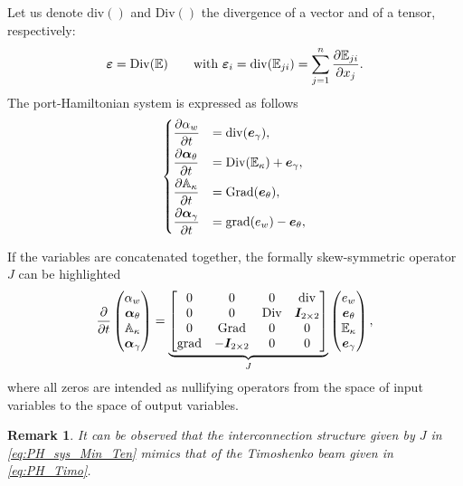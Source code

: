 \documentclass[preprint,12pt]{elsarticle}
\newtheorem{remark}{Remark}
\begin{document}
Let us denote $\mathrm{div}()$ and $\mathrm{Div}()$ the divergence of a vector and of a tensor, respectively:
\begin{equation*}
    \bm{\varepsilon} = \mathrm{Div}(\mathbb{E})  \qquad \text{with } \bm{\varepsilon}_i = \mathrm{div}(\mathbb{E}_{ji}) = \sum_{j = 1}^n \diffp{\mathbb{E}_{ji}}{x_j}.
\end{equation*}
The port-Hamiltonian system is expressed as follows 
\begin{equation}
\begin{cases}
\displaystyle\diffp{\alpha_w}{t} &= \mathrm{div}(\bm{e}_{\gamma}), \vspace{1mm} \\
\displaystyle\diffp{\bm\alpha_\theta}{t} &= \mathrm{Div}( \mathbb{E}_{\kappa}) + \bm{e}_{\gamma}, \vspace{1mm} \\
\displaystyle\diffp{\mathbb{A}_\kappa}{t} &= \mathrm{Grad}(\bm{e}_{\theta}), \vspace{1mm} \\
\displaystyle\diffp{ \bm\alpha_{\gamma} }{t} &= \mathrm{grad}(e_w) - \bm{e}_{\theta},
\end{cases}
\end{equation}

If the variables are concatenated together, the formally skew-symmetric operator $J$ can be highlighted 
\begin{equation}
\label{eq:PH_sys_Min_Ten}
\diffp{}{t}
\begin{pmatrix}
\alpha_w \\
\bm\alpha_\theta \\
\mathbb{A}_\kappa \\
\bm\alpha_{\gamma} \\
\end{pmatrix} = 
\underbrace{\begin{bmatrix}
	0  & 0  & 0  & \mathrm{div} \\
	0 & 0 &  \mathrm{Div} & \bm{I}_{2 \times 2}\\
	0  & \mathrm{Grad}  & 0  & 0\\
	\mathrm{grad} & -\bm{I}_{2 \times 2} &  0 & 0  \\
	\end{bmatrix}}_{J}
\begin{pmatrix}
e_w \\
\bm{e}_{\theta} \\
\mathbb{E}_{\kappa} \\
\bm{e}_{\gamma} \\
\end{pmatrix},
\end{equation}
where all zeros are intended as nullifying operators from the space of input variables to the space of output variables.
\begin{remark}
It can be observed that the interconnection structure given by $J$ in \eqref{eq:PH_sys_Min_Ten} mimics that of the Timoshenko beam given in \eqref{eq:PH_Timo}.
\end{remark}
\end{document}

